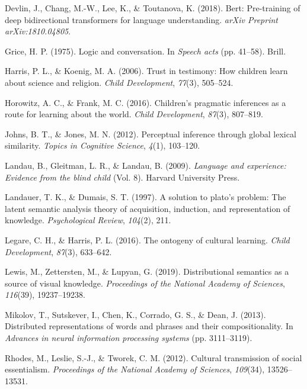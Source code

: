 \documentclass[10pt, letterpaper]{article}
\begin{document}
\leavevmode\hypertarget{ref-devlin2018}{}%
Devlin, J., Chang, M.-W., Lee, K., \& Toutanova, K. (2018). Bert:
Pre-training of deep bidirectional transformers for language
understanding. \emph{arXiv Preprint arXiv:1810.04805}.

\leavevmode\hypertarget{ref-grice1975}{}%
Grice, H. P. (1975). Logic and conversation. In \emph{Speech acts} (pp.
41--58). Brill.

\leavevmode\hypertarget{ref-harris2006}{}%
Harris, P. L., \& Koenig, M. A. (2006). Trust in testimony: How children
learn about science and religion. \emph{Child Development},
\emph{77}(3), 505--524.

\leavevmode\hypertarget{ref-horowitz2016}{}%
Horowitz, A. C., \& Frank, M. C. (2016). Children's pragmatic inferences
as a route for learning about the world. \emph{Child Development},
\emph{87}(3), 807--819.

\leavevmode\hypertarget{ref-johns2012}{}%
Johns, B. T., \& Jones, M. N. (2012). Perceptual inference through
global lexical similarity. \emph{Topics in Cognitive Science},
\emph{4}(1), 103--120.

\leavevmode\hypertarget{ref-landau2009}{}%
Landau, B., Gleitman, L. R., \& Landau, B. (2009). \emph{Language and
experience: Evidence from the blind child} (Vol. 8). Harvard University
Press.

\leavevmode\hypertarget{ref-landauer1997}{}%
Landauer, T. K., \& Dumais, S. T. (1997). A solution to plato's problem:
The latent semantic analysis theory of acquisition, induction, and
representation of knowledge. \emph{Psychological Review}, \emph{104}(2),
211.

\leavevmode\hypertarget{ref-legare2016}{}%
Legare, C. H., \& Harris, P. L. (2016). The ontogeny of cultural
learning. \emph{Child Development}, \emph{87}(3), 633--642.

\leavevmode\hypertarget{ref-lewis2019}{}%
Lewis, M., Zettersten, M., \& Lupyan, G. (2019). Distributional
semantics as a source of visual knowledge. \emph{Proceedings of the
National Academy of Sciences}, \emph{116}(39), 19237--19238.

\leavevmode\hypertarget{ref-mikolov2013}{}%
Mikolov, T., Sutskever, I., Chen, K., Corrado, G. S., \& Dean, J.
(2013). Distributed representations of words and phrases and their
compositionality. In \emph{Advances in neural information processing
systems} (pp. 3111--3119).

\leavevmode\hypertarget{ref-rhodes2012}{}%
Rhodes, M., Leslie, S.-J., \& Tworek, C. M. (2012). Cultural
transmission of social essentialism. \emph{Proceedings of the National
Academy of Sciences}, \emph{109}(34), 13526--13531.
\end{document}

